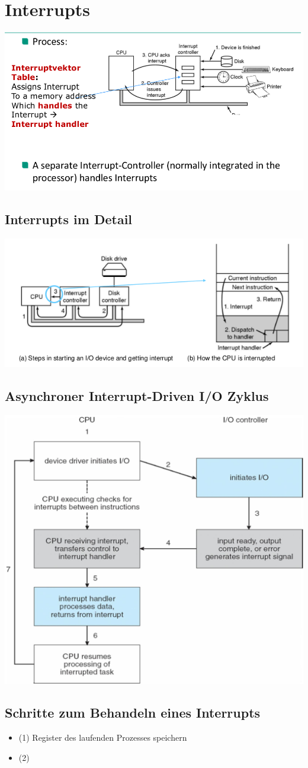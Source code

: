 \documentclass[a4paper]{scrreprt}
\begin{document}
\section{Interrupts}
\includegraphics[scale=0.7]{graphics/chapter9_4.png}
\subsection{Interrupts im Detail}
\includegraphics[scale=0.9]{graphics/chapter9_5.png}
\subsection{Asynchroner Interrupt-Driven I/O Zyklus}
\includegraphics[scale=0.3]{graphics/chapter9_6.png}
\subsection{Schritte zum Behandeln eines Interrupts}
\begin{itemize}
	\item (1) Register des laufenden Prozesses speichern
	\item (2) 
\end{itemize}
\end{document}
